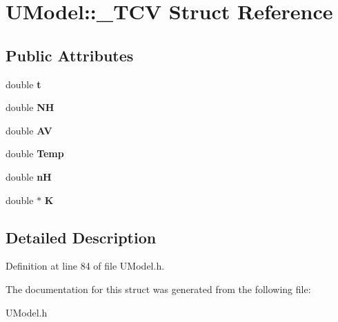 \hypertarget{structUModel_1_1__TCV}{}\section{U\+Model\+:\+:\+\_\+\+T\+CV Struct Reference}
\label{structUModel_1_1__TCV}
\subsection*{Public Attributes}
\begin{DoxyCompactItemize}
\item 
\mbox{\label{structUModel_1_1__TCV_a339c6e2dedd8ace07b81cf42ec055afc}} 
double {\bfseries t}
\item 
\mbox{\label{structUModel_1_1__TCV_a620c22b9cb5c94cde6735866d869b803}} 
double {\bfseries NH}
\item 
\mbox{\label{structUModel_1_1__TCV_aee45639c774754be614b8c769a13b7d6}} 
double {\bfseries AV}
\item 
\mbox{\label{structUModel_1_1__TCV_a22f88d0ab1e7663f245ee75fb87f3fea}} 
double {\bfseries Temp}
\item 
\mbox{\label{structUModel_1_1__TCV_acebd7387888536f111cc2c70e006e0ba}} 
double {\bfseries nH}
\item 
\mbox{\label{structUModel_1_1__TCV_a1dfc0929143dc175f6a576e340c32f30}} 
double $\ast$ {\bfseries K}
\end{DoxyCompactItemize}


\subsection{Detailed Description}


Definition at line 84 of file U\+Model.\+h.



The documentation for this struct was generated from the following file\+:\begin{DoxyCompactItemize}
\item 
U\+Model.\+h\end{DoxyCompactItemize}
